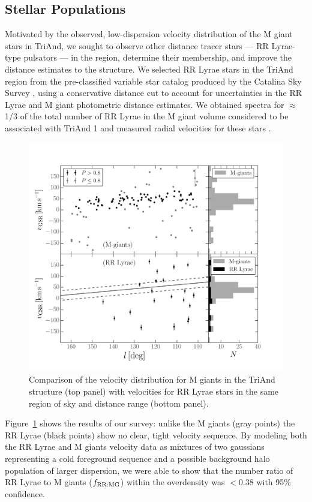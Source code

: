 \documentclass[galaxies,article,submit,moreauthors,pdftex,10pt,a4paper]{mdpi}
\newcommand{\frrmg}{\ensuremath{f_{\rm RR:MG}}}
\begin{document}
\subsection{Stellar Populations}
 \label{sec:populations}
Motivated by the observed, low-dispersion velocity distribution of the M giant stars in TriAnd, we sought to observe other distance tracer stars --- RR Lyrae-type pulsators --- in the region, determine their membership, and improve the distance estimates to the structure.
We selected RR Lyrae stars in the TriAnd region from the pre-classified
variable star catalog produced by the Catalina Sky Survey \cite{drake14},
using a conservative distance cut to account for uncertainties in the RR Lyrae
and M giant photometric distance estimates.
We obtained spectra for $\approx$1/3 of the total number of RR Lyrae in the M
giant volume considered to be associated with TriAnd 1 and measured radial
velocities for these stars \cite{pricewhelan15}.

\begin{figure}[t]
\centering
\includegraphics[width=5 in]{figures/triand_rrlyrae}
\caption{\label{fig:apw}
Comparison of the velocity distribution for M giants in the TriAnd structure
(top panel) with velocities for RR Lyrae stars in the same region of sky and
distance range (bottom panel).
}
\end{figure}

Figure~\ref{fig:apw} \cite[reproduced from][]{pricewhelan15} shows the results of our survey: unlike the M giants (gray points) the RR Lyrae (black points) show no clear, tight velocity sequence.
By modeling both the RR Lyrae and M giants velocity data as mixtures of two gaussians representing a cold foreground sequence and a possible background halo population of larger dispersion, we were able to show that the number ratio of RR Lyrae to M giants (\frrmg) within the overdensity was $<0.38$ with 95\% confidence.
\end{document}

